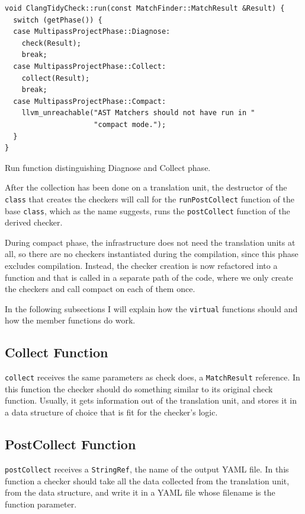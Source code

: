 \begin{listing}[H]
  \begin{verbatim}
void ClangTidyCheck::run(const MatchFinder::MatchResult &Result) {
  switch (getPhase()) {
  case MultipassProjectPhase::Diagnose:
    check(Result);
    break;
  case MultipassProjectPhase::Collect:
    collect(Result);
    break;
  case MultipassProjectPhase::Compact:
    llvm_unreachable("AST Matchers should not have run in "
                     "compact mode.");
  }
}
  \end{verbatim}
  \caption{Run function distinguishing Diagnose and Collect phase.}\label{lst:new-run}
\end{listing}

After the collection has been done on a translation unit, the destructor of the \texttt{class} that
creates the checkers will call for the \texttt{runPostCollect} function of the base
\texttt{class}, which as the name suggests, runs the \texttt{postCollect} function of the derived checker.

During compact phase, the infrastructure does not need the translation units at all, so there are no checkers instantiated during the
compilation, since this phase excludes compilation. Instead, the checker creation is now refactored into a function and that is called
in a separate path of the code, where we only create the checkers and call compact on each of them once.

In the following subsections I will explain how the \texttt{virtual} functions should and how the member functions do work.

\subsection{Collect Function}

\texttt{collect} receives the same parameters as check does, a \texttt{MatchResult} reference. In this function the checker should
do something similar to its original check function. Usually, it gets information out of the translation unit, and stores it in a data
structure of choice that is fit for the checker's logic.

\subsection{PostCollect Function}

\texttt{postCollect} receives a \texttt{StringRef}, the name of the output YAML file. In this function a checker should take all the data
collected from the translation unit, from the data structure, and write it in a YAML file whose filename is the function parameter.


